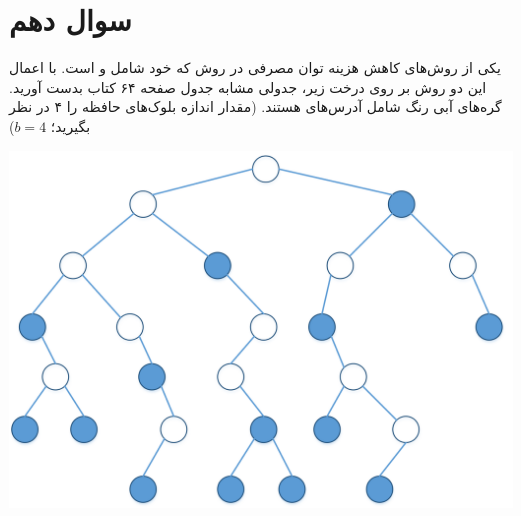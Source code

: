\section{سوال دهم}

یکی از روش‌های کاهش هزینه توان مصرفی در  روش  که خود شامل  و  است. با اعمال این دو روش بر روی درخت زیر، جدولی مشابه جدول صفحه ۶۴ کتاب بدست آورید. گره‌های آبی رنگ شامل آدرس‌های  هستند. (مقدار اندازه بلوک‌های حافظه را ۴ در نظر بگیرید؛ $b=4 $)


\begin{center}
	\includegraphics*[width=0.5\linewidth]{pics/img2.png}
\end{center}


\begin{qsolve}
	
\end{qsolve}